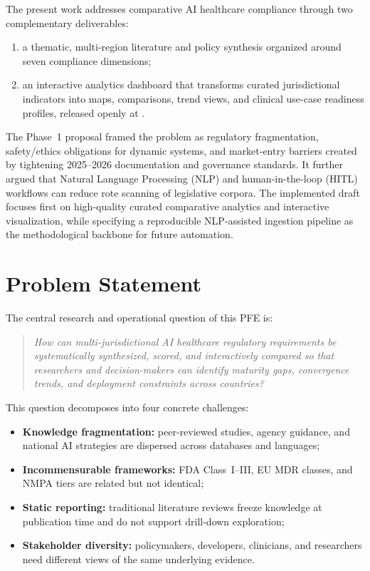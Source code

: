The present work addresses comparative AI healthcare compliance through two complementary deliverables:

\begin{enumerate}[noitemsep]
  \item a thematic, multi-region literature and policy synthesis organized around seven compliance dimensions;
  \item an interactive analytics dashboard that transforms curated jurisdictional indicators into maps, comparisons, trend views, and clinical use-case readiness profiles, released openly at \repoLink{}.
\end{enumerate}

The Phase~1 proposal framed the problem as regulatory fragmentation, safety/ethics obligations for dynamic systems, and market-entry barriers created by tightening 2025--2026 documentation and governance standards. It further argued that Natural Language Processing (NLP) and human-in-the-loop (HITL) workflows can reduce rote scanning of legislative corpora. The implemented draft focuses first on high-quality curated comparative analytics and interactive visualization, while specifying a reproducible NLP-assisted ingestion pipeline as the methodological backbone for future automation.

\section{Problem Statement}
\label{sec:problem}

The central research and operational question of this PFE is:

\begin{quote}
\textit{How can multi-jurisdictional AI healthcare regulatory requirements be systematically synthesized, scored, and interactively compared so that researchers and decision-makers can identify maturity gaps, convergence trends, and deployment constraints across countries?}
\end{quote}

This question decomposes into four concrete challenges:
\begin{itemize}[noitemsep]
  \item \textbf{Knowledge fragmentation:} peer-reviewed studies, agency guidance, and national AI strategies are dispersed across databases and languages;
  \item \textbf{Incommensurable frameworks:} FDA Class~I--III, EU MDR classes, and NMPA tiers are related but not identical;
  \item \textbf{Static reporting:} traditional literature reviews freeze knowledge at publication time and do not support drill-down exploration;
  \item \textbf{Stakeholder diversity:} policymakers, developers, clinicians, and researchers need different views of the same underlying evidence.
\end{itemize}

